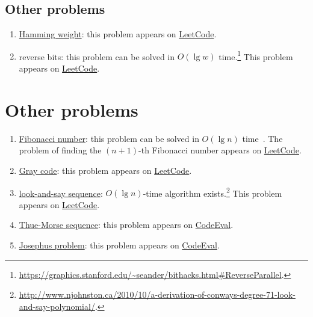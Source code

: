 \subsection{Other problems}
\begin{enumerate}
\item \href{https://en.wikipedia.org/wiki/Hamming_weight}{Hamming weight}: this problem appears on \href{https://leetcode.com/problems/number-of-1-bits/}{LeetCode}.
\item reverse bits: this problem can be solved in $O(\lg w)$ time.\footnote{\url{https://graphics.stanford.edu/~seander/bithacks.html\#ReverseParallel}.} This problem appears on \href{https://leetcode.com/problems/reverse-bits/}{LeetCode}.
\end{enumerate}

\section{Other problems}
\begin{enumerate}
\item \href{https://en.wikipedia.org/wiki/Fibonacci_number}{Fibonacci number}: this problem can be solved in $O(\lg n)$ time~\cite{Shortt1978}. The problem of finding the $(n+1)$-th Fibonacci number appears on \href{https://leetcode.com/problems/climbing-stairs/}{LeetCode}.
\item \href{https://en.wikipedia.org/wiki/Gray_code}{Gray code}: this problem appears on \href{https://leetcode.com/problems/gray-code/}{LeetCode}.
\item \href{https://en.wikipedia.org/wiki/Look-and-say\_sequence}{look-and-say sequence}: $O(\lg n)$-time algorithm exists.\footnote{\url{http://www.njohnston.ca/2010/10/a-derivation-of-conways-degree-71-look-and-say-polynomial/}.} This problem appears on \href{https://leetcode.com/problems/count-and-say/}{LeetCode}.
\item \href{https://en.wikipedia.org/wiki/Thue\%E2\%80\%93Morse_sequence}{Thue-Morse sequence}: this problem appears on \href{https://www.codeeval.com/open_challenges/125/}{CodeEval}.
\item \href{https://en.wikipedia.org/wiki/Josephus_problem}{Josephus problem}: this problem appears on \href{https://www.codeeval.com/open_challenges/75/}{CodeEval}.
\end{enumerate}


\printbibliography[heading=subbibliography]
